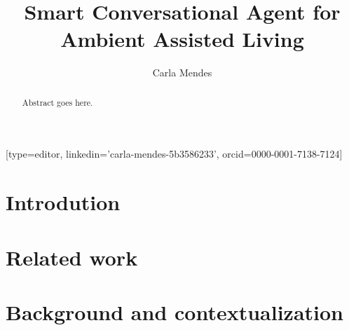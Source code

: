 \documentclass[a4paper,fleqn]{cas-sc}
\begin{document}
\let\WriteBookmarks\relax
\def\floatpagepagefraction{1}
\def\textpagefraction{.001}

\title [mode = title]{Smart Conversational Agent for Ambient Assisted Living}                     


\author[1]{Carla Mendes}[type=editor,
		linkedin='carla-mendes-5b3586233',
		orcid=0000-0001-7138-7124]

\address[1]{Computer Science and Communications Research Centre, School of Technology and Management, Polytechnic of Leiria, 2411-901 Leiria, Portugal}

\begin{abstract}
Abstract goes here.


\end{abstract}

%

\begin{keywords}

\end{keywords}


\maketitle

\section{Introdution}
\label{introduction}

\section{Related work}
\label{relatedWork}

\section{Background and contextualization}
\label{backgroundContextualization}
\end{document}
